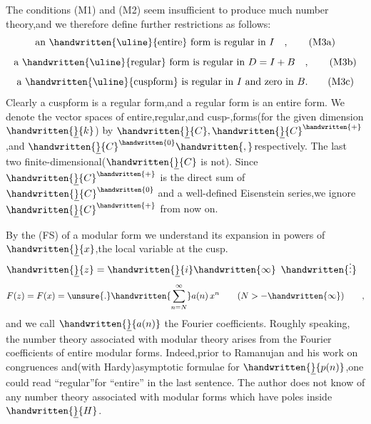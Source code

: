 The conditions (M1) and (M2) seem insufficient to produce much number theory,and we therefore define further restrictions as follows:
\[
\text{an \handwritten{\uline}{entire} form is regular in } I\quad ,
\tag*{(M3a)}
\]
\[
\text{a \handwritten{\uline}{regular} form is regular in } D=I+B\quad ,
\tag*{(M3b)}
\]
\[
\text{a \handwritten{\uline}{cuspform} is regular in } I \text{ and zero in } B.
\tag*{(M3c)}
\]
Clearly a cuspform is a regular form,and a regular form is an entire form. We denote the vector spaces of entire,regular,and cusp-,forms(for the given dimension $\handwritten{\underline}{k}$) by $\handwritten{\underline}{C},\handwritten{\underline}{C}^{\handwritten{+}}$,and $\handwritten{\underline}{C}^{\handwritten{0}}\handwritten{,}$respectively. The last two  finite-dimensional($\handwritten{\underline}{C}$ is not). Since $\handwritten{\underline}{C}^{\handwritten{+}}$ is the direct sum of $\handwritten{\underline}{C}^{\handwritten{0}}$ and a well-defined Eisenstein series,we ignore $\handwritten{\underline}{C}^{\handwritten{+}}$ from now on.

By the   (FS)\unsure{-} of a modular form we understand its expansion in powers of $\handwritten{\underline}{x}$,the local variable at the cusp. $\handwritten{\underline}{z}=\handwritten{\underline}{i}\handwritten{\infty}$ $\handwritten{\vdots}$
\[
F(z)=F(x)=\unsure{.}\handwritten{\sum_{n=N}^{\infty}}a(n)\,x^{n}\qquad (N>-\handwritten{\infty})\qquad ,
\]
and we call \reversemarginpar{}\normalmarginpar $\handwritten{\underline}{a(n)}$ the Fourier coefficients. Roughly speaking, the number theory associated with modular theory arises from the Fourier coefficients of entire modular forms. Indeed,prior to Ramanujan and his work on congruences and(with Hardy)asymptotic formulae for $\handwritten{\underline}{p(n)}$,one could read ``regular''for ``entire'' in the last sentence. The author does not know of any number theory associated with modular forms which have poles inside $\handwritten{\underline}{H}$.
\endgroup

